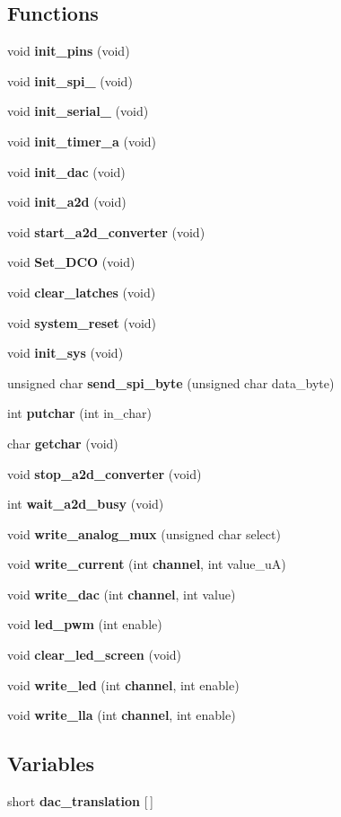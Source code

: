 \subsection*{Functions}
\begin{CompactItemize}
\item 
void {\bf init\_\-pins} (void)
\item 
void {\bf init\_\-spi\_} (void)
\item 
void {\bf init\_\-serial\_} (void)
\item 
void {\bf init\_\-timer\_\-a} (void)
\item 
void {\bf init\_\-dac} (void)
\item 
void {\bf init\_\-a2d} (void)
\item 
void {\bf start\_\-a2d\_\-converter} (void)
\item 
void {\bf Set\_\-DCO} (void)
\item 
void {\bf clear\_\-latches} (void)
\item 
void {\bf system\_\-reset} (void)
\item 
void {\bf init\_\-sys} (void)
\item 
unsigned char {\bf send\_\-spi\_\-byte} (unsigned char data\_\-byte)
\item 
int {\bf putchar} (int in\_\-char)
\item 
char {\bf getchar} (void)
\item 
void {\bf stop\_\-a2d\_\-converter} (void)
\item 
int {\bf wait\_\-a2d\_\-busy} (void)
\item 
void {\bf write\_\-analog\_\-mux} (unsigned char select)
\item 
void {\bf write\_\-current} (int {\bf channel}, int value\_\-u\-A)
\item 
void {\bf write\_\-dac} (int {\bf channel}, int value)
\item 
void {\bf led\_\-pwm} (int enable)
\item 
void {\bf clear\_\-led\_\-screen} (void)
\item 
void {\bf write\_\-led} (int {\bf channel}, int enable)
\item 
void {\bf write\_\-lla} (int {\bf channel}, int enable)
\end{CompactItemize}
\subsection*{Variables}
\begin{CompactItemize}
\item 
short {\bf dac\_\-translation} [$\,$]
\end{CompactItemize}


